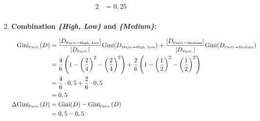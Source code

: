 \documentclass[
english,
smallborders
]{i6prcsht}
\newcommand{\OfSpecificValue}[3]{_{\text{\tiny #1#2#3}}}
\newcommand{\OfAttribute}[1]{_{\text{\tiny #1}}}
\begin{document}
\begin{solution}
\begin{enumerate}
\begin{enumerate}
\begin{enumerate}
\begin{enumerate}
\begin{alignat*}{2}
						                                                                 & = 0,25                                                                                                                                                                                                                                                     \\
					                        \end{alignat*}

					                  \item \textbf{Combination \textit{\{High, Low\}} and \textit{\{Medium\}}:}

					                        \begin{alignat*}{2}
						                        \text{Gini}\OfAttribute{Parti.}(D)       & = \frac{|D\OfSpecificValue{Parti.}{=}{High, Low}|}{|D\OfAttribute{Parti.}|} \text{Gini}(D\OfSpecificValue{Major}{=}{High, Low}) + \frac{|D\OfSpecificValue{Parti.}{=}{Medium}|}{|D\OfAttribute{Parti.}|} \text{Gini}(D\OfSpecificValue{Parti.}{=}{Medium}) \\
						                                                                 & = \frac{4}{6} \left(1 - \left(\frac{2}{4}\right)^2 - \left(\frac{2}{4}\right)^2\right) + \frac{2}{6} \left(1 - \left(\frac{1}{2}\right)^2 - \left(\frac{1}{2}\right)^2\right)                                                                              \\
						                                                                 & = \frac{4}{6} \cdot 0,5 + \frac{2}{6} \cdot 0,5                                                                                                                                                                                                            \\
						                                                                 & = 0,5                                                                                                                                                                                                                                                      \\
						                        \Delta\text{Gini}\OfAttribute{Parti.}(D) & = \text{Gini}(D) - \text{Gini}\OfAttribute{Parti.}(D)                                                                                                                                                                                                      \\
						                                                                 & = 0,5 - 0,5                                                                                                                                                                                                                                                \\

\end{alignat*}
\end{enumerate}
\end{enumerate}
\end{enumerate}
\end{enumerate}
\end{solution}
\end{document}
